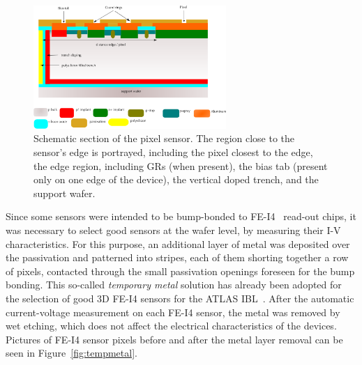 \begin{figure}[!htpb]
\begin{center}
\includegraphics[width=0.65\textwidth]{pixel_design_v3.png}
\caption{\label{fig:pixel}Schematic section of the pixel sensor. The region close to the sensor's edge is portrayed, including the pixel closest to the edge,
the edge region, including GRs (when present), the bias tab (present only on one edge of the device), the vertical doped trench, and the support wafer.}
\end{center}
\end{figure}

Since some sensors were intended to  be bump-bonded to  FE-I4~\cite{FEI4} read-out chips, 
it was necessary to select good sensors at the wafer level, by measuring their I-V characteristics.
 For this purpose, an additional layer of metal was deposited over the passivation and patterned into stripes, each of them shorting together a row of pixels, contacted through
 the small passivation openings foreseen for the bump bonding.
This so-called {\it temporary metal} solution has already been adopted for the selection of good 3D FE-I4 sensors for the ATLAS IBL~\cite{bib:metal}.
After the automatic current-voltage  measurement
 on each FE-I4 sensor, the metal was removed by  wet etching, which does not affect the electrical characteristics  of the devices.
Pictures of FE-I4 sensor pixels before and after the metal layer removal can be seen in Figure~\ref{fig:tempmetal}.

